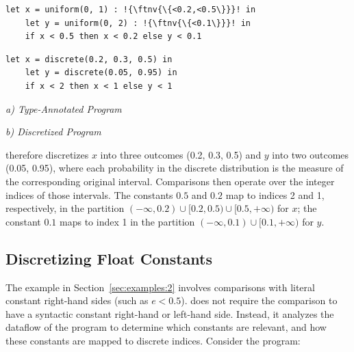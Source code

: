 \begin{center}
    \begin{minipage}[c]{0.42\linewidth}
    \centering
    \begin{lstlisting}[aboveskip=0.6em,belowskip=0.6em,escapechar=!,gobble=4]
    let x = uniform(0, 1) : !{\ftnv{\{<0.2,<0.5\}}}! in
    let y = uniform(0, 2) : !{\ftnv{\{<0.1\}}}! in
    if x < 0.5 then x < 0.2 else y < 0.1
    \end{lstlisting}
    \end{minipage}
    \hfill
    \begin{minipage}[c]{0.4\linewidth}
    \centering
    \begin{minipage}{0.92\linewidth}
    \begin{lstlisting}[aboveskip=0.6em,belowskip=0.6em,gobble=4]
    let x = discrete(0.2, 0.3, 0.5) in
    let y = discrete(0.05, 0.95) in
    if x < 2 then x < 1 else y < 1
    \end{lstlisting}
    \end{minipage}
    \end{minipage}

    \smallskip
    \begin{minipage}{0.42\linewidth}
    \centering
    \textit{a) Type-Annotated Program}
    \end{minipage}
    \hfill
    \begin{minipage}{0.4\linewidth}
    \centering
    \textit{b) Discretized Program}
    \end{minipage}
    \label{fig:examples:2}
\end{center}
\vspace{0.6em}


\Slice{} therefore discretizes $x$ into three outcomes \discrete(0.2, 0.3, 0.5) and $y$ into two outcomes \discrete(0.05, 0.95), where each probability in the discrete distribution is the measure of the corresponding original interval. Comparisons then operate over the integer indices of those intervals. The constants $0.5$ and $0.2$ map to indices 2 and 1, respectively, in the partition $(-\infty,0.2)\cup[0.2,0.5)\cup[0.5,+\infty)$ for $x$; the constant $0.1$ maps to index 1 in the partition $(-\infty,0.1)\cup[0.1,+\infty)$ for $y$.


\iffalse
\subsection{Discretizing Float Constants}\label{sec:examples:3}
The example in Section~\ref{sec:examples:2} involves comparisons with literal constant right-hand sides (such as $e < 0.5$).
\Slice{} does not require the comparison to have a syntactic constant right-hand or left-hand side. Instead, it analyzes the dataflow of the program to determine which constants are relevant, and how these constants are mapped to discrete indices.
Consider the program:

